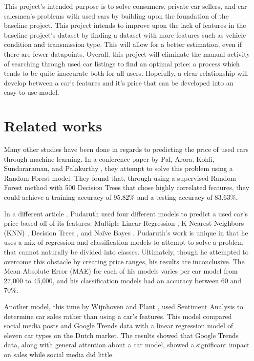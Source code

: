 \documentclass[compsoc]{IEEEtran}
\begin{document}
This project's intended purpose is to solve consumers, private car sellers, and car salesmen's problems with used cars by building upon the foundation of the baseline project. This project intends to improve upon the lack of features in the baseline project's dataset by finding a dataset with more features such as vehicle condition and transmission type. This will allow for a better estimation, even if there are fewer datapoints. Overall, this project will eliminate the manual activity of searching through used car listings to find an optimal price: a process which tends to be quite inaccurate both for all users. Hopefully, a clear relationship will develop between a car's features and it's price that can be developed into an easy-to-use model.


\section{Related works} 
Many other studies have been done in regards to predicting the price of used cars through machine learning. In a conference paper by Pal, Arora, Kohli, Sundararaman, and Palakurthy \cite{article:relatedwork1}, they attempt to solve this problem using a Random Forest \cite{model:random_forest} model. They found that, through using a supervised Random Forest method with 500 Decision Trees that chose highly correlated features, they could achieve a training accuracy of 95.82\% and a testing accuracy of 83.63\%.

In a different article \cite{article:relatedwork2}, Pudaruth used four different models to predict a used car's price based off of its features: Multiple Linear Regression \cite{model:multiple_linear_regression}, K-Nearest Neighbors (KNN) \cite{model:k_nearest_neighbors}, Decision Trees \cite{model:decision_trees}, and Naïve Bayes \cite{model:naive_bayes}. Pudaruth's work is unique in that he uses a mix of regression and classification models to attempt to solve a problem that cannot naturally be divided into classes. Ultimately, though he attempted to overcome this obstacle by creating price ranges, his results are inconclusive. The Mean Absolute Error (MAE) for each of his models varies per car model from 27,000 to 45,000, and his classification models had an accuracy between 60 and 70\%.

Another model, this time by Wijnhoven and Plant \cite{article:relatedwork3}, used Sentiment Analysis \cite{model:sentiment_analysis} to determine car sales rather than using a car's features. This model compared social media posts and Google Trends data with a linear regression model of eleven car types on the Dutch market. The results showed that Google Trends data, along with general attention about a car model, showed a significant impact on sales while social media did little.
\end{document}
